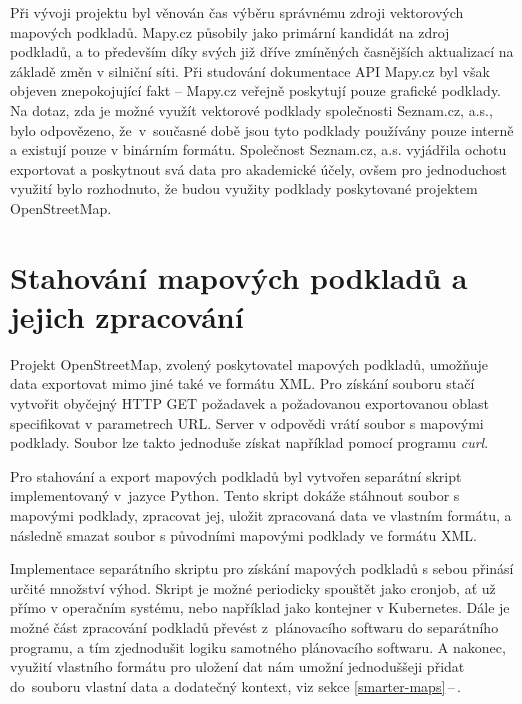 \documentclass[czech, bachelor]{diploma}
\newcommand{\filipref}[1]{\ref{#1}\,--\,\nameref{#1}}
\begin{document}
Při vývoji projektu byl věnován čas výběru správnému zdroji vektorových mapových podkladů. Mapy.cz působily jako primární kandidát
na zdroj podkladů, a to především díky svých již dříve zmíněných časnějších aktualizací na základě změn v silniční síti.
Při studování dokumentace API Mapy.cz byl však objeven znepokojující fakt -- Mapy.cz veřejně poskytují pouze grafické podklady.
Na dotaz, zda je možné využít vektorové podklady společnosti Seznam.cz, a.s., bylo odpovězeno, že~v~současné době jsou tyto
podklady používány pouze interně a existují pouze v binárním formátu. Společnost Seznam.cz, a.s. vyjádřila ochotu exportovat
a poskytnout svá data pro akademické účely, ovšem pro jednoduchost využití bylo rozhodnuto, že budou využity podklady poskytované
projektem OpenStreetMap.

\section{Stahování mapových podkladů a jejich zpracování}

Projekt OpenStreetMap, zvolený poskytovatel mapových podkladů, umožňuje data exportovat mimo jiné také ve formátu XML. Pro získání
souboru stačí vytvořit obyčejný HTTP GET požadavek a požadovanou exportovanou oblast specifikovat v parametrech URL. Server
v odpovědi vrátí soubor s mapovými podklady. Soubor lze takto jednoduše získat například pomocí programu \emph{curl}.

Pro stahování a export mapových podkladů byl vytvořen separátní skript implementovaný v~jazyce Python. Tento skript dokáže
stáhnout soubor s mapovými podklady, zpracovat jej, uložit zpracovaná data ve vlastním formátu, a následně smazat soubor
s původními mapovými podklady ve formátu XML.

Implementace separátního skriptu pro získání mapových podkladů s sebou přinásí určité množství výhod. Skript je možné periodicky
spouštět jako cronjob, ať už přímo v operačním systému, nebo například jako kontejner v Kubernetes. Dále je možné část zpracování
podkladů převést z~plánovacího softwaru do separátního programu, a tím zjednodušit logiku samotného plánovacího softwaru.
A nakonec, využití vlastního formátu pro uložení dat nám umožní jednoduššeji přidat do~souboru vlastní data a dodatečný kontext,
viz sekce \filipref{smarter-maps}.
\end{document}
